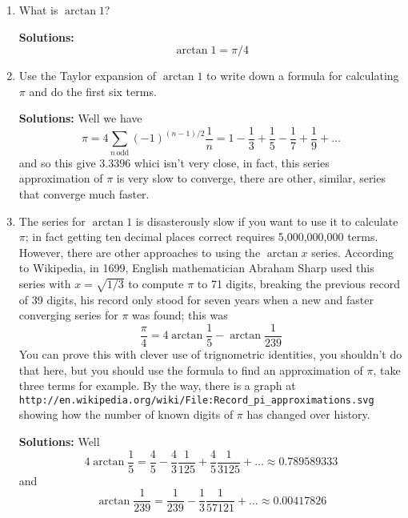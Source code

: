\documentclass[12pt]{article}
\begin{document}
\begin{enumerate}
\item What is $\arctan{1}$?

\textbf{Solutions: } 
\begin{equation}
\arctan{1}=\pi/4
\end{equation}


\item Use the Taylor expansion of $\arctan{1}$ to write down a formula
  for calculating $\pi$ and do the first six terms. 

\textbf{Solutions: } Well we have
\begin{equation}
\pi=4\sum_{n\,\mbox{odd}} (-1)^{(n-1)/2}\frac{1}{n}=1-\frac{1}{3}+\frac{1}{5}-\frac{1}{7}+\frac{1}{9}+\ldots
\end{equation}
and so this give $3.3396$ whici isn't very close, in fact, this series
approximation of $\pi$ is very slow to converge, there are other,
similar, series that converge much faster.

\item The series for $\arctan{1}$ is disasterously slow if you want to
  use it to calculate $\pi$; in fact getting ten decimal places
  correct requires 5,000,000,000 terms. However, there are other
  approaches to using the $\arctan{x}$ series. According to Wikipedia,
  in 1699, English mathematician Abraham Sharp used this series with
  $x=\sqrt{1/3} $ to compute $\pi$ to 71 digits, breaking the previous
  record of 39 digits, his record only stood for seven years when a
  new and faster converging series for $\pi$ was found; this was
\begin{equation}
\frac{\pi}{4}=4\arctan{\frac{1}{5}}-\arctan{\frac{1}{239}}
\end{equation}
You can prove this with clever use of trignometric identities, you
shouldn't do that here, but you should use the formula to find an
approximation of $\pi$, take three terms for example. By the way,
there is a graph
at\\ \texttt{http://en.wikipedia.org/wiki/File:Record\_pi\_approximations.svg}\\ showing
how the number of known digits of $\pi$ has changed over history.

\textbf{Solutions: } Well
\begin{equation}
4\arctan{\frac{1}{5}}=\frac{4}{5}-\frac{4}{3}\frac{1}{125}+\frac{4}{5}\frac{1}{3125}+\ldots\approx 0.789589333
\end{equation}
and
\begin{equation}
\arctan{\frac{1}{239}}=\frac{1}{239}-\frac{1}{3}\frac{1}{57121}+\ldots\approx 0.00417826
\end{equation}


\end{enumerate}
\end{document}

